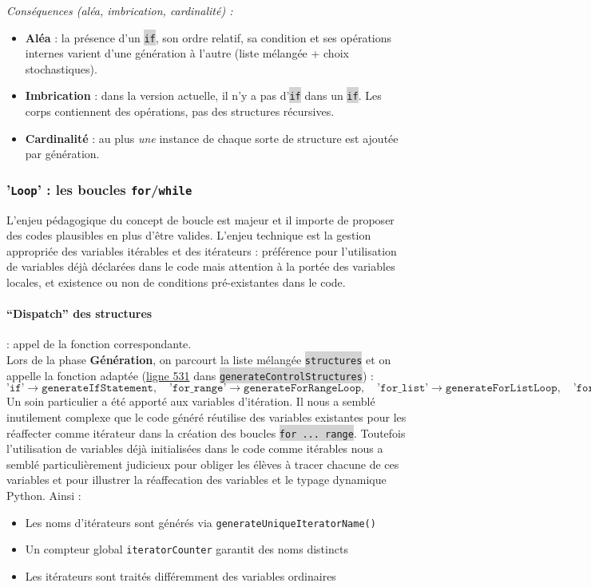 \documentclass[11pt,a4paper]{article}
\newcommand{\code}[1]{\colorbox{lightgray}{\texttt{\small #1}}}
\begin{document}
\emph{Conséquences (aléa, imbrication, cardinalité) :} 
\begin{itemize}
  \item \textbf{Aléa} : la présence d’un \code{if}, son ordre relatif, sa condition et ses opérations internes varient d’une génération à l’autre (liste mélangée + choix stochastiques).
  \item \textbf{Imbrication} : dans la version actuelle, il n'y a pas d’\code{if} dans un \code{if}. Les corps contiennent des opérations, pas des structures récursives.
  \item \textbf{Cardinalité} : au plus \emph{une} instance de chaque sorte de structure est ajoutée par génération.
\end{itemize}


\subsubsection{'\texttt{Loop}' : les boucles \texttt{for}/\texttt{while}}
L'enjeu pédagogique du concept de boucle est majeur et il importe de proposer des codes plausibles en plus d'être valides. L'enjeu technique est la gestion appropriée des variables itérables et des itérateurs : préférence pour l'utilisation de variables déjà déclarées dans le code mais attention à la portée des variables locales, et existence ou non de conditions pré-existantes dans le code.

\paragraph{``Dispatch'' des structures} :  appel de la fonction correspondante. \\
Lors de la phase \textbf{Génération}, on parcourt la liste mélangée \code{structures} et on appelle la fonction adaptée (\href{https://github.com/edu-mateescoj/gyminf/blob/main/static/js/code-generator.js#L1083}{ligne 531} dans \code{generateControlStructures}) :
\[
\texttt{'if'} \to \texttt{generateIfStatement},\quad
\texttt{'for\_range'} \to \texttt{generateForRangeLoop},\quad
\texttt{'for\_list'} \to \texttt{generateForListLoop},\quad
\texttt{'for\_str'} \to \texttt{generateForStrLoop},\quad
\texttt{'while'} \to \texttt{generateWhileLoop},\quad
\texttt{'function'} \to \texttt{generateFunction}.
\]
Un soin particulier a été apporté aux variables d'itération. Il nous a semblé inutilement complexe que le code généré réutilise des variables existantes pour les réaffecter comme itérateur dans la création des boucles \code{for ... range}. Toutefois l'utilisation de variables déjà initialisées dans le code comme itérables nous a semblé particulièrement judicieux pour obliger les élèves à tracer chacune de ces variables et pour illustrer la réaffecation des variables et le typage dynamique Python. Ainsi :
\begin{itemize}
    \item Les noms d'itérateurs sont générés via \texttt{generateUniqueIteratorName()}
    \item Un compteur global \texttt{iteratorCounter} garantit des noms distincts
    \item Les itérateurs sont traités différemment des variables ordinaires
\end{itemize}
\end{document}
